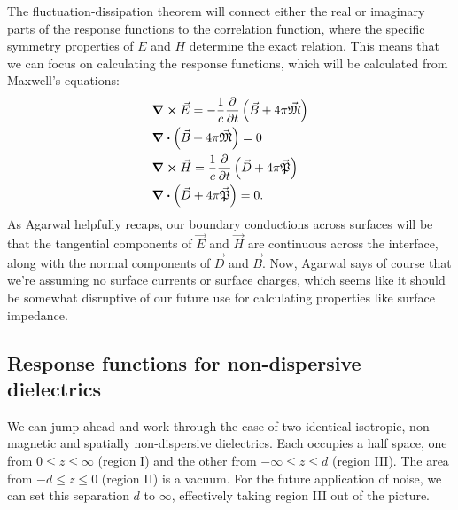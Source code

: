 \documentclass[../main.tex]{subfiles}
\newcommand{\polr}{\vec{\mathfrak{P}}}
\newcommand{\magn}{\vec{\mathfrak{M}}}
\begin{document}
	The fluctuation-dissipation theorem will connect either the real or imaginary parts of the response functions to the correlation function, where the specific symmetry properties of $E$ and $H$ determine the exact relation.
	This means that we can focus on calculating the response functions, which will be calculated from Maxwell's equations:
	\begin{align}
		&\curl{\vec{E}} = - \frac{1}{c} \pdv{t} \left( \vec{B} + 4 \pi \magn \right) \\
		&\div( \vec{B} + 4 \pi \magn) = 0 \\
		&\curl{\vec{H}} = \frac{1}{c} \pdv{t} \left( \vec{D} + 4 \pi \polr \right) \\
		&\div(\vec{D} + 4 \pi \polr) = 0.
	\end{align}
	As Agarwal helpfully recaps, our boundary conductions across surfaces will be that the tangential components of $\vec{E}$ and $\vec{H}$ are continuous across the interface, along with the normal components of $\vec{D}$ and $\vec{B}$.
	Now, Agarwal says of course that we're assuming no surface currents or surface charges, which seems like it should be somewhat disruptive of our future use for calculating properties like surface impedance.

	\subsection[Non-dispersive dielectric response]{Response functions for non-dispersive dielectrics} \label{subsec:localresponse}

	We can jump ahead and work through the case of two identical isotropic, non-magnetic and spatially non-dispersive dielectrics.
	Each occupies a half space, one from $0 \leq z \leq \infty$ (region I) and the other from $-\infty \leq z \leq d$ (region III).
	The area from $-d \leq z \leq 0$ (region II) is a vacuum.
	For the future application of noise, we can set this separation $d$ to $\infty$, effectively taking region III out of the picture.
\end{document}
